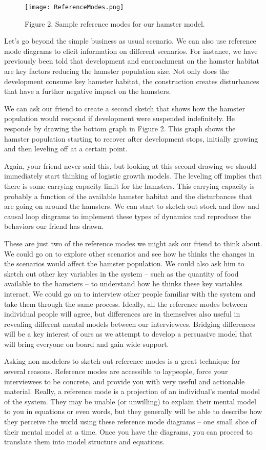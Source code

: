 \documentclass[]{memoir}
\makeatletter
\def\maxwidth{\ifdim\Gin@nat@width>\linewidth\linewidth
\else\Gin@nat@width\fi}
\let\Oldincludegraphics\includegraphics
\renewcommand{\includegraphics}[1]{\Oldincludegraphics[width=\maxwidth]{#1}}
\makeatother
\begin{document}
\begin{figure}[htbp]
\centering
\texttt{[image: ReferenceModes.png]}
\caption{Figure 2. Sample reference modes for our hamster model.}
\end{figure}

Let's go beyond the simple business as usual scenario. We can also use
reference mode diagrams to elicit information on different scenarios.
For instance, we have previously been told that development and
encroachment on the hamster habitat are key factors reducing the hamster
population size. Not only does the development consume key hamster
habitat, the construction creates disturbances that have a further
negative impact on the hamsters.

We can ask our friend to create a second sketch that shows how the
hamster population would respond if development were suspended
indefinitely. He responds by drawing the bottom graph in Figure 2. This
graph shows the hamster population starting to recover after development
stops, initially growing and then leveling off at a certain point.

Again, your friend never said this, but looking at this second drawing
we should immediately start thinking of logistic growth models. The
leveling off implies that there is some carrying capacity limit for the
hamsters. This carrying capacity is probably a function of the available
hamster habitat and the disturbances that are going on around the
hamsters. We can start to sketch out stock and flow and causal loop
diagrams to implement these types of dynamics and reproduce the
behaviors our friend has drawn.

These are just two of the reference modes we might ask our friend to
think about. We could go on to explore other scenarios and see how he
thinks the changes in the scenarios would affect the hamster population.
We could also ask him to sketch out other key variables in the system --
such as the quantity of food available to the hamsters -- to understand
how he thinks these key variables interact. We could go on to interview
other people familiar with the system and take them through the same
process. Ideally, all the reference modes between individual people will
agree, but differences are in themselves also useful in revealing
different mental models between our interviewees. Bridging differences
will be a key interest of ours as we attempt to develop a persuasive
model that will bring everyone on board and gain wide support.

Asking non-modelers to sketch out reference modes is a great technique
for several reasons. Reference modes are accessible to laypeople, force
your interviewees to be concrete, and provide you with very useful and
actionable material. Really, a reference mode is a projection of an
individual's mental model of the system. They may be unable (or
unwilling) to explain their mental model to you in equations or even
words, but they generally will be able to describe how they perceive the
world using these reference mode diagrams -- one small slice of their
mental model at a time. Once you have the diagrams, you can proceed to
translate them into model structure and equations.
\end{document}
